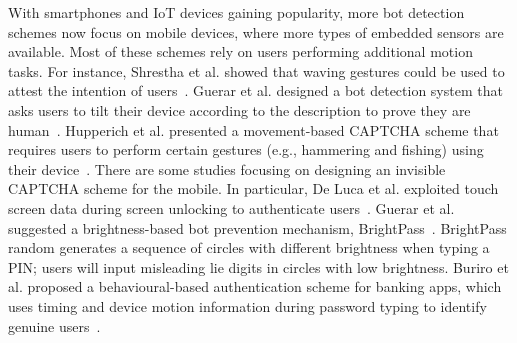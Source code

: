 With smartphones and IoT devices gaining popularity, more bot detection schemes now focus on mobile devices, where more types of embedded sensors are available. Most of these schemes rely on users performing additional motion tasks. For instance, Shrestha et al. showed that waving gestures could be used to attest the intention of users~\cite{10.1007/978-3-319-02937-5_11}. Guerar et al. designed a bot detection system that asks users to tilt their device according to the description to prove they are human~\cite{guerar2018completely}. Hupperich et al. presented a movement-based CAPTCHA scheme that requires users to perform certain gestures (e.g., hammering and fishing) using their device~\cite{10.1007/978-3-319-45572-3_3}. There are some studies focusing on designing an invisible CAPTCHA scheme for the mobile. In particular, De Luca et al. exploited touch screen data during screen unlocking to authenticate users~\cite{DeLuca:2012:TMO:2207676.2208544}. Guerar et al. suggested a brightness-based bot prevention mechanism, BrightPass~\cite{guerar2016using}. BrightPass random generates a sequence of circles with different brightness when typing a PIN; users will input misleading lie digits in circles with low brightness. Buriro et al. proposed a behavioural-based authentication scheme for banking apps, which uses timing and device motion information during password typing to identify genuine users~\cite{buriro2017evaluation}. 